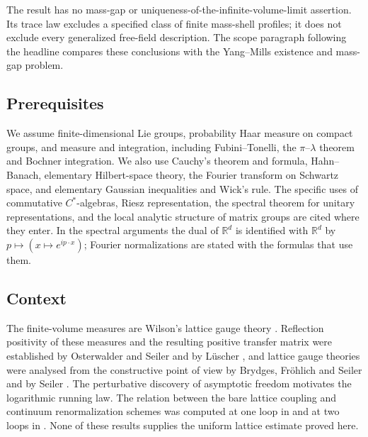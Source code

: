 The result has no mass-gap or uniqueness-of-the-infinite-volume-limit
assertion. Its trace law excludes a specified class of finite mass-shell
profiles; it does not exclude every generalized free-field description.
The scope paragraph following the headline compares these conclusions
with the Yang--Mills existence and mass-gap problem.

\subsection{Prerequisites}
\label{ex-outline-prerequisites}

We assume finite-dimensional Lie groups, probability Haar measure on compact
groups, and measure and integration, including Fubini--Tonelli, the
$\pi$--$\lambda$ theorem and Bochner integration. We also use Cauchy's
theorem and formula, Hahn--Banach, elementary Hilbert-space theory, the
Fourier transform on Schwartz space, and elementary Gaussian inequalities
and Wick's rule. The specific uses of commutative $C^*$-algebras,
Riesz representation, the spectral theorem for unitary representations,
and the local analytic structure of matrix groups are cited where they
enter. In the spectral arguments the dual of $\mathbb R^d$ is identified
with $\mathbb R^d$ by $p\mapsto(x\mapsto e^{ip\cdot x})$; Fourier
normalizations are stated with the formulas that use them.

\subsection{Context}
\label{ex-outline-context}

The finite-volume measures are Wilson's lattice gauge theory
\cite{Wilson74}. Reflection positivity of these measures and the
resulting positive transfer matrix were established by Osterwalder and
Seiler and by L\"uscher \cite{OsterwalderSeiler,Luscher77}, and lattice
gauge theories were analysed from the constructive point of view by
Brydges, Fr\"ohlich and Seiler and by Seiler
\cite{BFS79,BFS80,BFS81,Seiler82}. The perturbative discovery of
asymptotic freedom \cite{GrossWilczek73,Politzer73} motivates the
logarithmic running law. The relation between the bare lattice coupling
and continuum renormalization schemes was computed at one loop in
\cite{HasenfratzHasenfratz80,DashenGross81} and at two loops in
\cite{LuscherWeiszCoupling}. None of these results supplies the uniform
lattice estimate proved here.

